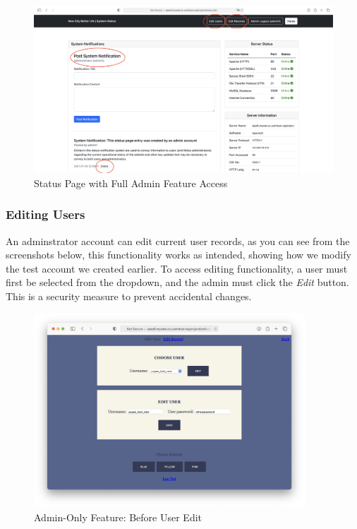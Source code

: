 \documentclass[12pt, letterpaper]{article}
\begin{document}
\begin{figure}[htbp]
\centering
\includegraphics[width=4.8in]{images/30-journey-a01c.png}
\caption{Status Page with Full Admin Feature Access}
\end{figure}

\newpage
\subsubsection*{Editing Users}
An adminstrator account can edit current user records, as you can see from the screenshots below, this functionality works as intended, showing how we  modify the test account we created earlier. To access editing functionality, a user must first be selected from the dropdown, and the admin must click the \textit{Edit} button. This is a security measure to prevent accidental changes.

\begin{figure}[htbp]
\centering
\includegraphics[width=4in]{images/30-journey-a02a.png}
\caption{Admin-Only Feature: Before User Edit}
\end{figure}
\end{document}
